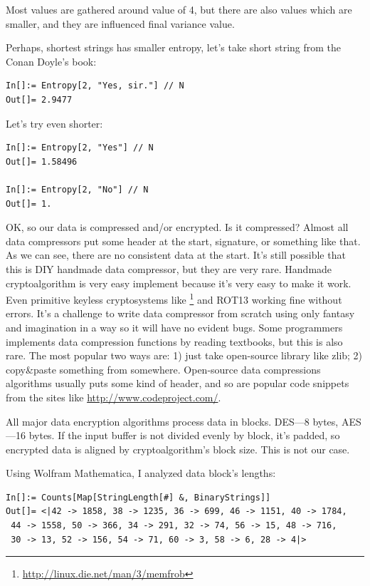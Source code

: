 Most values are gathered around value of 4, but there are also values which are smaller,
and they are influenced final variance value.

Perhaps, shortest strings has smaller entropy, let's take short string from the Conan Doyle's book:

\begin{lstlisting}
In[]:= Entropy[2, "Yes, sir."] // N
Out[]= 2.9477
\end{lstlisting}

Let's try even shorter:

\begin{lstlisting}
In[]:= Entropy[2, "Yes"] // N
Out[]= 1.58496

In[]:= Entropy[2, "No"] // N
Out[]= 1.
\end{lstlisting}


OK, so our data is compressed and/or encrypted.
Is it compressed? Almost all data compressors put some header at the start, signature, or something like that.
As we can see, there are no consistent data at the start.
It's still possible that this is DIY handmade data compressor, but they are very rare.
Handmade cryptoalgorithm is very easy implement because it's very easy to make it work.
Even primitive keyless cryptosystems like \footnote{\url{http://linux.die.net/man/3/memfrob}}
and ROT13 working fine without errors.
It's a challenge to write data compressor from scratch using only fantasy and imagination in a way so it will have no evident bugs.
Some programmers implements data compression functions by reading textbooks, but this is also rare.
The most popular two ways are:
1) just take open-source library like zlib;
2) copy\&paste something from somewhere.
Open-source data compressions algorithms usually puts some kind of header, and so
are popular code snippets from the sites like \url{http://www.codeproject.com/}.


All major data encryption algorithms process data in blocks. DES---8 bytes, AES---16 bytes.
If the input buffer is not divided evenly by block, it's padded, so encrypted data is aligned
by cryptoalgorithm's block size.
This is not our case.

Using Wolfram Mathematica, I analyzed data block's lengths:

\begin{lstlisting}
In[]:= Counts[Map[StringLength[#] &, BinaryStrings]]
Out[]= <|42 -> 1858, 38 -> 1235, 36 -> 699, 46 -> 1151, 40 -> 1784, 
 44 -> 1558, 50 -> 366, 34 -> 291, 32 -> 74, 56 -> 15, 48 -> 716, 
 30 -> 13, 52 -> 156, 54 -> 71, 60 -> 3, 58 -> 6, 28 -> 4|>
\end{lstlisting}

